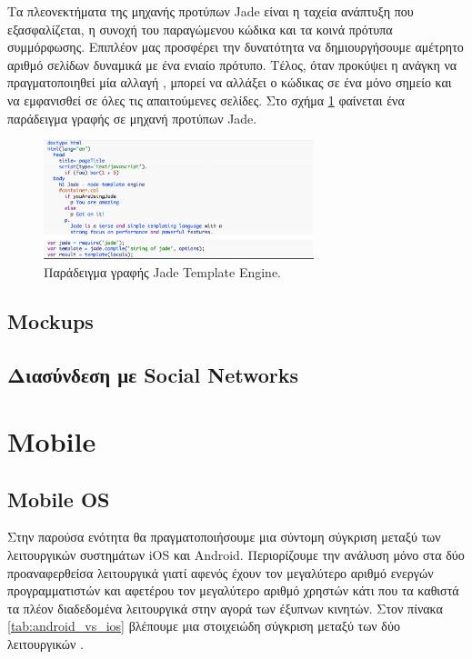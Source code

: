 Τα πλεονεκτήματα της μηχανής προτύπων Jade είναι η ταχεία ανάπτυξη που εξασφαλίζεται, η συνοχή του παραγώμενου κώδικα και τα κοινά πρότυπα συμμόρφωσης. Επιπλέον μας προσφέρει την δυνατότητα να δημιουργήσουμε αμέτρητο αριθμό σελίδων δυναμικά με ένα ενιαίο πρότυπο. Τέλος, όταν προκύψει η ανάγκη να πραγματοποιηθεί μία αλλαγή , μπορεί  να αλλάξει ο κώδικας σε ένα μόνο σημείο και να εμφανισθεί σε όλες τις απαιτούμενες σελίδες. Στο σχήμα \ref{fig:jade}	φαίνεται ένα παράδειγμα γραφής σε μηχανή προτύπων Jade.
	
  \begin{figure}[h]
	    \centering
	    \includegraphics[width=0.7\textwidth]{jade.png}
	    \caption{Παράδειγμα γραφής Jade Template Engine.}
	    \label{fig:jade}
	\end{figure}
	
	
	\subsection{Mockups}
	\subsection{Διασύνδεση με Social Networks}

\section{Mobile}
	\subsection{Mobile OS}
		Στην παρούσα ενότητα θα πραγματοποιήσουμε μια σύντομη σύγκριση μεταξύ των λειτουργικών συστημάτων iOS και Android. Περιορίζουμε την ανάλυση μόνο στα δύο προαναφερθείσα λειτουργικά γιατί αφενός έχουν τον μεγαλύτερο αριθμό ενεργών προγραμματιστών και αφετέρου τον μεγαλύτερο αριθμό χρηστών κάτι που τα καθιστά τα πλέον διαδεδομένα λειτουργικά στην αγορά των έξυπνων κινητών. Στον πίνακα \ref{tab:android_vs_ios} βλέπουμε μια στοιχειώδη σύγκριση μεταξύ των δύο λειτουργικών \cite{smartphoneMarketShare}\cite{androidPublish}\cite{applePublish}\cite{androidSource}.
		
